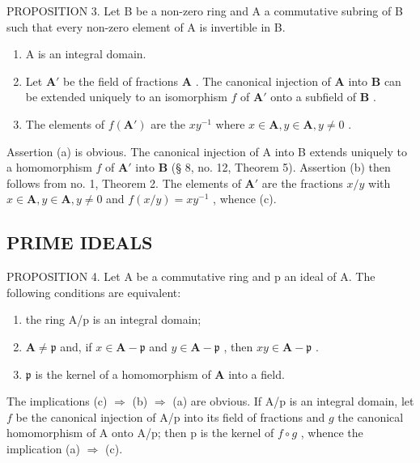 PROPOSITION 3. Let B be a non-zero ring and A a commutative subring of B such that every non-zero element of A is invertible in B.

\begin{enumerate}
\def\labelenumi{(\alph{enumi})}
\item
  A is an integral domain.
\item
  Let \(\mathbf{A}'\) be the field of fractions \(\mathbf{A}\) . The canonical injection of \(\mathbf{A}\) into \(\mathbf{B}\) can be extended uniquely to an isomorphism \(f\) of \(\mathbf{A}'\) onto a subfield of \(\mathbf{B}\) .
\item
  The elements of \(f(\mathbf{A}')\) are the \(xy^{-1}\) where \(x \in \mathbf{A}, y \in \mathbf{A}, y \neq 0\) .
\end{enumerate}

Assertion (a) is obvious. The canonical injection of A into B extends uniquely to a homomorphism \(f\) of \(\mathbf{A}'\) into \(\mathbf{B}\) (§ 8, no. 12, Theorem 5). Assertion (b) then follows from no. 1, Theorem 2. The elements of \(\mathbf{A}'\) are the fractions \(x / y\) with \(x \in \mathbf{A}, y \in \mathbf{A}, y \neq 0\) and \(f(x / y) = xy^{-1}\) , whence (c).

\subsection{PRIME IDEALS}

PROPOSITION 4. Let A be a commutative ring and p an ideal of A. The following conditions are equivalent:

\begin{enumerate}
\def\labelenumi{(\alph{enumi})}
\item
  the ring A/p is an integral domain;
\item
  \(\mathbf{A} \neq \mathfrak{p}\) and, if \(x \in \mathbf{A} - \mathfrak{p}\) and \(y \in \mathbf{A} - \mathfrak{p}\) , then \(xy \in \mathbf{A} - \mathfrak{p}\) .
\item
  \(\mathfrak{p}\) is the kernel of a homomorphism of \(\mathbf{A}\) into a field.
\end{enumerate}

The implications (c) \(\Rightarrow\) (b) \(\Rightarrow\) (a) are obvious. If A/p is an integral domain, let \(f\) be the canonical injection of A/p into its field of fractions and \(g\) the canonical homomorphism of A onto A/p; then p is the kernel of \(f \circ g\) , whence the implication (a) \(\Rightarrow\) (c).

